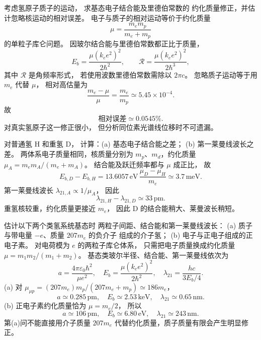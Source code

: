 考虑氢原子质子的运动，
求基态电子结合能及里德伯常数的
约化质量修正，并估计忽略核运动的相对误差。
\exsolution
电子与质子的相对运动等价于约化质量
\[
 \mu=\frac{m_em_p}{m_e+m_p}
\]
的单粒子库仑问题。
因玻尔结合能与里德伯常数都正比于质量，
\[
 \boxed{E_b=\frac{\mu(k_ee^2)^2}{2\hbar^2}},\qquad
 \boxed{\mathcal R=
 \frac{\mu(k_ee^2)^2}{2\hbar^3}},
\]
其中 $\mathcal R$ 是角频率形式，
若使用波数里德伯常数需除以 $2\pi c$。
忽略质子运动等于用 $m_e$ 代替 $\mu$，
相对高估量为
\[
 \frac{m_e-\mu}{\mu}=\frac{m_e}{m_p}
 \simeq5.45\times10^{-4}.
\]
故
\[
 \boxed{\text{相对误差}\simeq0.0545\%}.
\]
\excheck 对真实氢原子这一修正很小，
但分析同位素光谱线位移时不可遗漏。

对普通氢 H 和重氢 D，
计算：(a) 基态电子结合能之差；
(b) 第一莱曼线波长之差。
\exsolution
两体系电子质量相同，核质量分别为
$m_p$、$m_d$，约化质量
$\mu_A=m_em_A/(m_e+m_A)$。
结合能及跃迁频率都与 $\mu$ 成正比，
故
\[
 \boxed{E_{b,D}-E_{b,H}
 =13.6057\,\mathrm{eV}\,
 \frac{\mu_D-\mu_H}{m_e}
 \simeq3.7\,\mathrm{meV}}.
\]
第一莱曼线波长
$\lambda_{21,A}\propto1/\mu_A$，
因此
\[
 \boxed{\lambda_{21,H}-\lambda_{21,D}
 \simeq33\,\mathrm{pm}}.
\]
\excheck 重氢核较重，约化质量更接近 $m_e$，
因此 D 的结合能稍大、莱曼波长稍短。

估计以下两个类氢系统基态时
两粒子间距、结合能和第一莱曼线波长：
(a) 质子与带电量 $-e$、质量 $207m_e$ 的负介子
组成的介子氢；
(b) 电子与正电子组成的正电子素。
\exsolution
对电荷模为 $e$ 的两粒子库仑体系，
只需把电子质量换成约化质量
$\mu=m_1m_2/(m_1+m_2)$。
基态类玻尔半径、结合能、第一莱曼线依次为
\[
 a=\frac{4\pi\varepsilon_0\hbar^2}{\mu e^2},
 \quad E_b=\frac{\mu(k_ee^2)^2}{2\hbar^2},
 \quad\lambda_{21}=\frac{hc}{3E_b/4}.
\]
(a) 对 $\mu_{\mu p}=
(207m_e)m_p/(207m_e+m_p)\simeq186m_e$，
\[
 \boxed{a\simeq0.285\,\mathrm{pm},\quad
 E_b\simeq2.53\,\mathrm{keV},\quad
 \lambda_{21}\simeq0.65\,\mathrm{nm}}.
\]
(b) 正电子素约化质量恰为 $\mu=m_e/2$，
所以
\[
 \boxed{a\simeq106\,\mathrm{pm},\quad
 E_b\simeq6.80\,\mathrm{eV},\quad
 \lambda_{21}\simeq243\,\mathrm{nm}}.
\]
\excheck 第(a)问不能直接用介子质量 $207m_e$
代替约化质量，质子质量有限会产生明显修正。
